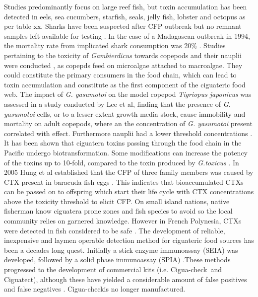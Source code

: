 \documentclass[12pt]{article}
\begin{document}
Studies predominantly focus on large reef fish, but toxin accumulation has been detected in eels, sea cucumbers, starfish, seals, jelly fish, lobster and octopus as per table xx. 
Sharks have been suspected after CFP outbreak but no remnant samples left available for testing \cite{boisier1995fatal,lehane2000ciguatera,habermehl1994severe}. In the case of a Madagascan outbreak in 1994, the mortality rate from implicated shark consumption was 20\% \cite{habermehl1994severe}. 
Studies pertaining to the toxicity of \emph{Gambierdicus} towards copepods and their nauplii were conducted \cite{lee2014toxicity}, as copepds feed on microalgae attached to macroalgae. They could constitute the primary consumers in the food chain, which can lead to toxin accumulation \cite{raisuddin2007copepod} and constitute as the first component of the ciguateric food web. The impact of \emph{G. yasumotoi} on the model copepod \emph{Tigriopus japonicus} was assessed in a study conducted by Lee et al, finding that the presence of \emph{G. yasumotoi} cells, or to a lesser extent growth media stock, cause immobility and mortality on adult copepods, where an the concentration of \emph{G. yasumotoi} present correlated with effect. Furthermore nauplii had a lower threshold concentrations \cite{lee2014toxicity}.
It has been shown that ciguatera toxins passing through the food chain in the Pacific undergo biotransformation. %
Some modifications can increase the potency of the toxins up to 10-fold, compared to the toxin produced by \textit{G.toxicus} \cite{lewis2006ciguatera}.
In 2005 Hung et al established that the CFP of three family members was caused by CTX present in baracuda fish eggs \cite{hung2005persistent}. This indicates that bioaccumulated CTXs can be passed on to offspring which start their life cycle with CTX concentrations above the toxicity threshold to elicit CFP. %
On small island nations, native fisherman know ciguatera prone zones and fish species to avoid so the local community relies on garnered knowledge. However in French Polynesia, CTXs were detected in fish considered to be safe \cite{darius2007ciguatera}.
The development of reliable, inexpensive and laymen operable detection method for ciguateric food sources has been a decades long quest. Initially a stick enzyme immunoassay (SEIA) \cite{hokama1985rapid} was developed, followed by a solid phase immunoassay (SPIA) \cite{hokama1990simplified}.These methods progressed to the development of commercial kits (i.e. Cigua-check\textregistered \ and Ciguatect\textregistered), although these have yielded a considerable amount of false positives and false negatives \cite{wong2005study}. Cigua-check\textregistered is no longer manufactured.%
\end{document}
